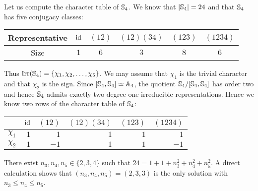 \begin{example} 
Let us compute the character table of $\mathbb{S}_4$. 
We know that $|\mathbb{S}_4|=24$ and that 
$\mathbb{S}_4$ has five conjugacy classes:
	\begin{center}
		\begin{tabular}{c|ccccc}
			Representative & $\operatorname{id}$ & $(12)$ & $(12)(34)$ & $(123)$ & $(1234)$\tabularnewline
			\hline
			Size & $1$ & $6$ & $3$ & $8$ & $6$
		\end{tabular}
	\end{center}
Thus $\operatorname{Irr}(\mathbb{S}_4)=\{\chi_1,\chi_2,\dots,\chi_5\}$. We may 
assume that $\chi_1$ is the trivial character and
that $\chi_2$ is the sign. Since 
$[\mathbb{S}_4,\mathbb{S}_4]\simeq\mathbb{A}_4$, the quotient 
$\mathbb{S}_4/[\mathbb{S}_4,\mathbb{S}_4]$ has order two and hence $\mathbb{S}_4$ 
admits exactly two degree-one irreducible representations. Hence
we know two rows of the character table of $\mathbb{S}_4$: 
	\begin{center}
		\begin{tabular}{|c|rrrrr|}
			\hline
			& $\operatorname{id}$ & $(12)$ & $(12)(34)$ & $(123)$ & $(1234)$\tabularnewline
			\hline
			$\chi_1$ & $1$ & $1$ & $1$ & $1$ & $1$\tabularnewline
			$\chi_2$ & $1$ & $-1$ & $1$ & $1$ & $-1$\tabularnewline
			\hline
		\end{tabular}
	\end{center}
    
	There exist $n_3,n_4,n_5\in\{2,3,4\}$ such that 
	$24=1+1+n_3^2+n_4^2+n_5^2$. A direct calculation shows that $(n_3,n_4,n_5)=(2,3,3)$ is the only solution with
    $n_3\leq n_4\leq n_5$.


\end{example}
